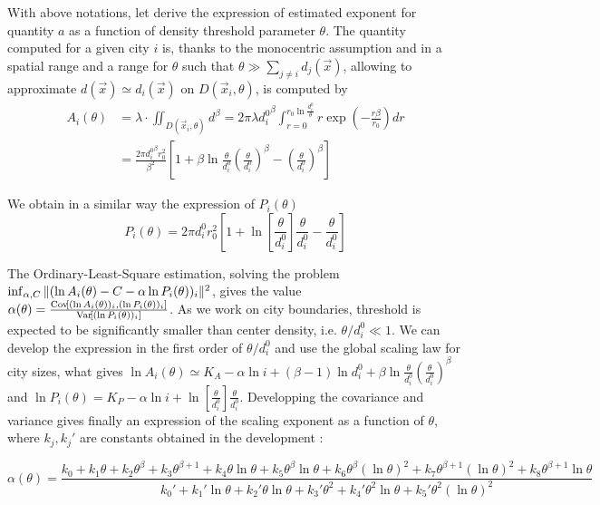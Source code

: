 With above notations, let derive the expression of estimated exponent for quantity $a$ as a function of density threshold parameter $\theta$. The quantity computed for a given city $i$ is, thanks to the monocentric assumption and in a spatial range and a range for $\theta$ such that $\theta \gg \sum_{j\neq i}{d_j(\vec{x})}$, allowing to approximate $d(\vec{x})\simeq d_i(\vec{x})$ on $D(\vec{x}_i,\theta)$, is computed by
\[
\begin{split}
A_i(\theta) & = \lambda\cdot \iint_{D(\vec{x}_i,\theta)}{d^\beta} = 2\pi\lambda {d_i^0}^{\beta} \int_{r=0}^{r_0 \ln{\frac{d_i^0}{\theta}}}{r\exp{\left(-\frac{r\beta}{r_0}\right)}dr}\\
& = \frac{2\pi {d_i^0}^\beta r_0^2}{\beta^2} \left[1 + \beta \ln{\frac{\theta}{d_i^0}\left(\frac{\theta}{d_i^0}\right)^\beta} - \left(\frac{\theta}{d_i^0}\right)^\beta\right]
\end{split}
\]

We obtain in a similar way the expression of $P_i(\theta)$
\[
P_i(\theta) = 2\pi d_i^0 r_0^2 \left[1 + \ln{\left[\frac{\theta}{d_i^0}\right]}\frac{\theta}{d_i^0} - \frac{\theta}{d_i^0}\right]
\]

The Ordinary-Least-Square estimation, solving the problem $\inf_{\alpha,C}\| (\ln{A_i(\theta)} - C - \alpha \ln{P_i(\theta)})_i \|^2$, gives the value $\alpha(\theta) = \frac{\operatorname{Cov}\!\left[(\ln{A_i(\theta)})_i,(\ln{P_i(\theta)})_i\right]}{\operatorname{Var}\!\left[(\ln{P_i(\theta)})_i\right]}$. As we work on city boundaries, threshold is expected to be significantly smaller than center density, i.e. $\theta / d_i^0 \ll 1$. We can develop the expression in the first order of $\theta / d_i^0$ and use the global scaling law for city sizes, what gives $\ln{A_i(\theta)} \simeq K_A - \alpha \ln{i} + (\beta - 1)\ln{d_i^0} + \beta \ln{\frac{\theta}{d_i^0}\left(\frac{\theta}{d_i^0}\right)^\beta} $ and $\ln{P_i(\theta)} = K_P - \alpha \ln{i} + \ln{\left[\frac{\theta}{d_i^0}\right]}\frac{\theta}{d_i^0}$. Developping the covariance and variance gives finally an expression of the scaling exponent as a function of $\theta$, where $k_j,{k_j}'$ are constants obtained in the development :

\begin{equation}
\label{eq:th}
\alpha(\theta) = \frac{k_0 + k_1 \theta + k_2 \theta^\beta + k_3 \theta^{\beta + 1} +  k_4 \theta \ln{\theta} + k_5 \theta^\beta \ln{\theta} + k_6 \theta^\beta (\ln{\theta})^2 + k_7 \theta^{\beta + 1}(\ln{\theta})^2 + k_8 \theta^{\beta + 1}\ln{\theta}}{k_0'+k_1' \ln{\theta} + k_2' \theta \ln{\theta} + k_3' \theta^2 + k_4' \theta^2\ln{\theta} + k_5' \theta^2 (\ln{\theta})^2}
\end{equation}


